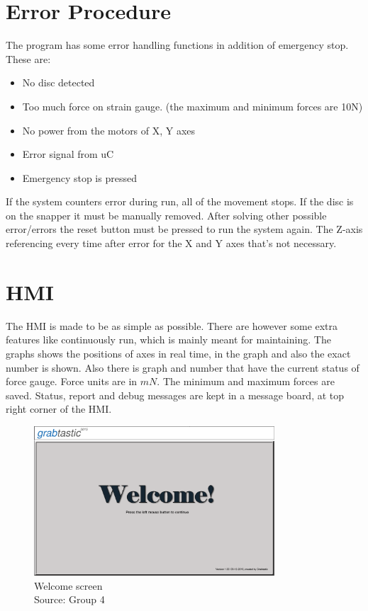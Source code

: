 \documentclass[a4paper,12pt]{scrreprt}
\begin{document}
\section{Error Procedure}
The program has some error handling functions in addition of emergency stop. These are:
\begin{itemize}
\item No disc detected
\item Too much force on strain gauge. (the maximum and minimum forces are 10N)
\item No power from the motors of X, Y axes
\item Error signal from \acs{uC}
\item Emergency stop is pressed
\end{itemize}
If the system counters error during run, all of the movement stops. If the disc is on the snapper it must be manually removed. After solving other possible error/errors the reset button must be pressed to run the system again. The Z-axis referencing every time after error for the X and Y axes that's not necessary.

\section{\acs{HMI}}
The \acs{HMI} is made to be as simple as possible. There are however some extra features like continuously run, which is mainly meant for maintaining. The graphs shows the positions of axes in real time, in the graph and also the exact number is shown. Also there is graph and number that have the current status of force gauge. Force units are in $mN$. The minimum and maximum forces are saved. Status, report and debug messages are kept in a message board, at top right corner of the \acs{HMI}.

\begin{figure}[H]
  \centering
   \includegraphics[width=0.8\textwidth]{pictures/Welcome1080}
   \caption[Welcome screen]{Welcome screen\\
	Source: Group 4}
   \label{fig:start view}
\end{figure} 
\end{document}
